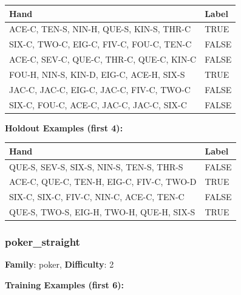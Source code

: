 \documentclass[10pt,a4paper]{article}
\begin{document}
\begin{small}
\begin{tabular}{p{8cm}l}
\toprule
Hand & Label \\
\midrule
ACE-C, TEN-S, NIN-H, QUE-S, KIN-S, THR-C & \textcolor{positive}{TRUE} \\
SIX-C, TWO-C, EIG-C, FIV-C, FOU-C, TEN-C & \textcolor{negative}{FALSE} \\
ACE-C, SEV-C, QUE-C, THR-C, QUE-C, KIN-C & \textcolor{negative}{FALSE} \\
FOU-H, NIN-S, KIN-D, EIG-C, ACE-H, SIX-S & \textcolor{positive}{TRUE} \\
JAC-C, JAC-C, EIG-C, JAC-C, FIV-C, TWO-C & \textcolor{negative}{FALSE} \\
SIX-C, FOU-C, ACE-C, JAC-C, JAC-C, SIX-C & \textcolor{negative}{FALSE} \\
\bottomrule
\end{tabular}
\end{small}

\textbf{Holdout Examples (first 4):}

\begin{small}
\begin{tabular}{p{8cm}l}
\toprule
Hand & Label \\
\midrule
QUE-S, SEV-S, SIX-S, NIN-S, TEN-S, THR-S & \textcolor{negative}{FALSE} \\
ACE-C, QUE-C, TEN-H, EIG-C, FIV-C, TWO-D & \textcolor{positive}{TRUE} \\
SIX-C, SIX-C, FIV-C, NIN-C, ACE-C, TEN-C & \textcolor{negative}{FALSE} \\
QUE-S, TWO-S, EIG-H, TWO-H, QUE-H, SIX-S & \textcolor{positive}{TRUE} \\
\bottomrule
\end{tabular}
\end{small}

\vspace{0.5cm}

\subsubsection{poker\_straight}

\textbf{Family}: poker, \textbf{Difficulty}: 2

\textbf{Training Examples (first 6):}
\end{document}
